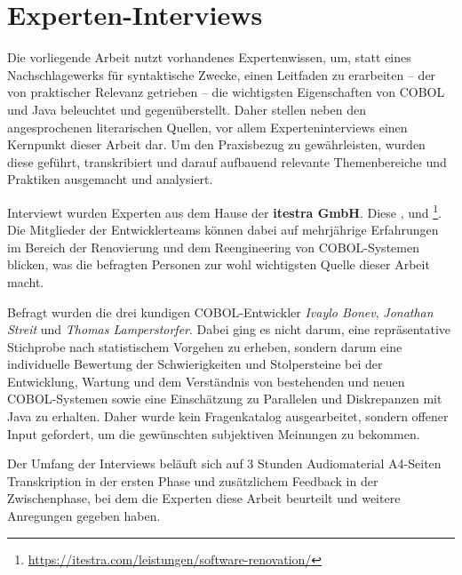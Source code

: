 \section{Experten-Interviews}\label{interviews}
Die vorliegende Arbeit nutzt vorhandenes Expertenwissen, um, statt eines Nachschlagewerks für syntaktische Zwecke, einen Leitfaden zu erarbeiten -- der von praktischer Relevanz getrieben -- die wichtigsten Eigenschaften von COBOL und Java beleuchtet und gegenüberstellt. Daher stellen neben den angesprochenen literarischen Quellen, vor allem Experteninterviews einen Kernpunkt dieser Arbeit dar. Um den Praxisbezug zu gewährleisten, wurden diese geführt, transkribiert und darauf aufbauend relevante Themenbereiche und Praktiken ausgemacht und analysiert.

Interviewt wurden Experten aus dem Hause der \textbf{itestra GmbH}. Diese ,  und \footnote{\label{itestraFootnote}\url{https://itestra.com/leistungen/software-renovation/} \visitedOn}. Die Mitglieder der Entwicklerteams können dabei auf mehrjährige Erfahrungen im Bereich der Renovierung und dem Reengineering von COBOL-Systemen blicken, was die befragten Personen zur wohl wichtigsten Quelle dieser Arbeit macht.

Befragt wurden die drei kundigen COBOL-Entwickler \textit{Ivaylo Bonev}, \textit{Jonathan Streit} und \textit{Thomas Lamperstorfer}. Dabei ging es nicht darum, eine repräsentative Stichprobe nach statistischem Vorgehen zu erheben, sondern darum eine individuelle Bewertung der Schwierigkeiten und Stolpersteine bei der Entwicklung, Wartung und dem Verständnis von bestehenden und neuen COBOL-Systemen sowie eine Einschätzung zu Parallelen und Diskrepanzen mit Java zu erhalten. Daher wurde kein Fragenkatalog ausgearbeitet, sondern offener Input gefordert, um die gewünschten subjektiven Meinungen zu bekommen. 

Der Umfang der Interviews beläuft sich auf 3 Stunden Audiomaterial  A4-Seiten Transkription in der ersten Phase und zusätzlichem Feedback in der Zwischenphase, bei dem die Experten diese Arbeit beurteilt und weitere Anregungen gegeben haben.